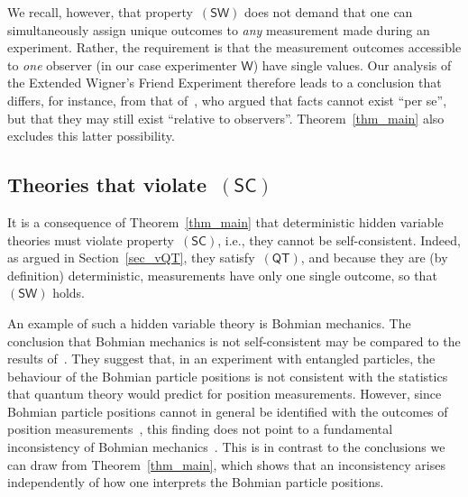 \documentclass{article}
\theoremstyle{plain}
\theoremstyle{definition}
\newcommand*{\Friendone}{\mathsf{F1}}
\newcommand*{\Wigner}{\mathsf{W}}
\newcommand*{\splus}{{\textstyle + \frac{1}{2}}}
\newcommand*{\QT}{\mathsf{(QT)}}
\newcommand*{\SW}{\mathsf{(SW)}}
\newcommand*{\SelfCons}{\mathsf{(SC)}}
\newcommand*{\ok}{\mathsf{ok}}
\newcommand*{\head}{\mathsf{head}}
\newcommand*{\tail}{\mathsf{tail}}
\begin{document}
We recall, however, that property~$\SW$ does not demand that one can simultaneously assign unique outcomes to \emph{any} measurement made during an experiment. Rather, the requirement is  that  the measurement outcomes accessible to \emph{one} observer (in our case experimenter $\Wigner$) have single values.  Our analysis of the Extended Wigner's Friend Experiment therefore leads to a conclusion that differs, for instance, from that of~\cite{Brukner15}, who argued that facts cannot exist ``per se'', but that they may still exist ``relative to observers''.  Theorem~\ref{thm_main} also excludes this latter possibility. 


\subsection{Theories that violate~$\SelfCons$}

It is a consequence of Theorem~\ref{thm_main} that deterministic hidden variable theories must violate property~$\SelfCons$, i.e., they cannot be self-consistent. Indeed, as argued in Section~\ref{sec_vQT}, they satisfy~$\QT$, and because they are (by definition) deterministic, measurements have only one single outcome, so that~$\SW$ holds. 

An example of such a hidden variable theory is Bohmian mechanics. The conclusion that Bohmian mechanics is not self-consistent may be compared to the results of~\cite{CorMor02,KiuWer10}. They suggest that, in an experiment with entangled particles, the behaviour of the Bohmian particle positions  is not consistent with the statistics that quantum theory would predict for position measurements.  However, since Bohmian particle positions cannot in general be identified with the outcomes of position measurements~\cite{ESSW92,Vaidman05}, this finding does not point to a fundamental inconsistency of Bohmian mechanics~\cite{Gisin15}. This is in  contrast to the conclusions we can draw from Theorem~\ref{thm_main}, which shows that an inconsistency arises independently of how one interprets the Bohmian particle positions.

\end{document}
